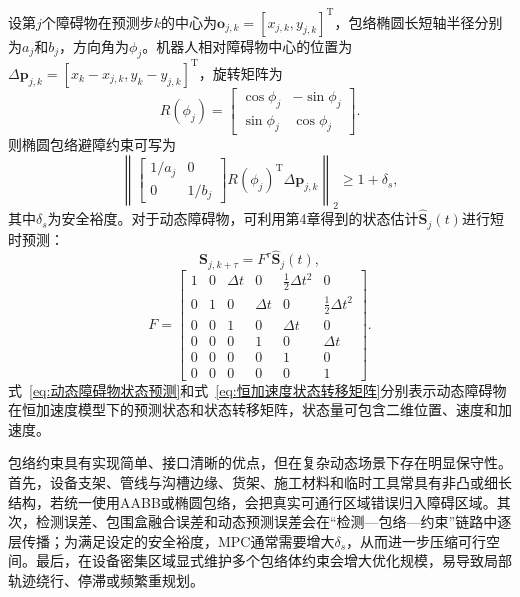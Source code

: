 设第$j$个障碍物在预测步$k$的中心为$\mathbf{o}_{j,k}=[x_{j,k},y_{j,k}]^{\mathrm{T}}$，包络椭圆长短轴半径分别为$a_j$和$b_j$，方向角为$\phi_j$。机器人相对障碍物中心的位置为$\Delta\mathbf{p}_{j,k}=[x_k-x_{j,k},y_k-y_{j,k}]^{\mathrm{T}}$，旋转矩阵为
\begin{equation}
	R(\phi_j)
	=
	\begin{bmatrix}
		\cos\phi_j & -\sin\phi_j\\
		\sin\phi_j & \cos\phi_j
	\end{bmatrix}.
	\label{eq:障碍物旋转矩阵}
\end{equation}
则椭圆包络避障约束可写为
\begin{equation}
	\left\|
	\begin{bmatrix}
		1/a_j & 0\\
		0 & 1/b_j
	\end{bmatrix}
	R(\phi_j)^{\mathrm{T}}
	\Delta\mathbf{p}_{j,k}
	\right\|_2
	\geq
	1+\delta_s,
	\label{eq:椭圆包络避障约束}
\end{equation}
其中$\delta_s$为安全裕度。对于动态障碍物，可利用第4章得到的状态估计$\hat{\mathbf{S}}_j(t)$进行短时预测：
\begin{equation}
	\mathbf{S}_{j,k+\tau}
	=
	F^{\tau}\hat{\mathbf{S}}_j(t),
	\label{eq:动态障碍物状态预测}
\end{equation}
\begin{equation}
	F
	=
	\begin{bmatrix}
		1 & 0 & \Delta t & 0 & \frac{1}{2}\Delta t^2 & 0\\
		0 & 1 & 0 & \Delta t & 0 & \frac{1}{2}\Delta t^2\\
		0 & 0 & 1 & 0 & \Delta t & 0\\
		0 & 0 & 0 & 1 & 0 & \Delta t\\
		0 & 0 & 0 & 0 & 1 & 0\\
		0 & 0 & 0 & 0 & 0 & 1
	\end{bmatrix}.
	\label{eq:恒加速度状态转移矩阵}
\end{equation}
式~\eqref{eq:动态障碍物状态预测}和式~\eqref{eq:恒加速度状态转移矩阵}分别表示动态障碍物在恒加速度模型下的预测状态和状态转移矩阵，状态量可包含二维位置、速度和加速度。

包络约束具有实现简单、接口清晰的优点，但在复杂动态场景下存在明显保守性。首先，设备支架、管线与沟槽边缘、货架、施工材料和临时工具常具有非凸或细长结构，若统一使用AABB或椭圆包络，会把真实可通行区域错误归入障碍区域。其次，检测误差、包围盒融合误差和动态预测误差会在“检测—包络—约束”链路中逐层传播；为满足设定的安全裕度，MPC通常需要增大$\delta_s$，从而进一步压缩可行空间。最后，在设备密集区域显式维护多个包络体约束会增大优化规模，易导致局部轨迹绕行、停滞或频繁重规划。

